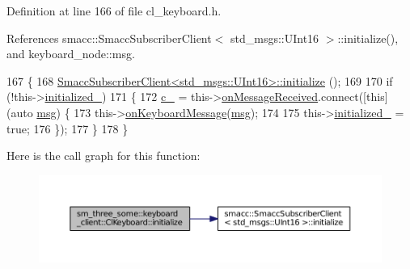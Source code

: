 Definition at line 166 of file cl\+\_\+keyboard.\+h.



References smacc\+::\+Smacc\+Subscriber\+Client$<$ std\+\_\+msgs\+::\+U\+Int16 $>$\+::initialize(), and keyboard\+\_\+node\+::msg.


\begin{DoxyCode}
167         \{
168                 \hyperlink{classsmacc_1_1SmaccSubscriberClient_acfa97685ecc588fe61eb57002354b58a}{SmaccSubscriberClient<std\_msgs::UInt16>::initialize}
      ();
169 
170                 \textcolor{keywordflow}{if} (!this->\hyperlink{classsm__three__some_1_1keyboard__client_1_1ClKeyboard_a27fc5aa7027eda6dddd0756448b48172}{initialized\_})
171                 \{
172                         \hyperlink{classsm__three__some_1_1keyboard__client_1_1ClKeyboard_aa55cfcdd60014aed37b8318224e47f9d}{c\_} = this->\hyperlink{classsmacc_1_1SmaccSubscriberClient_a7635fbb013c6fdbc3998da11b44766bb}{onMessageReceived}.connect([\textcolor{keyword}{this}](\textcolor{keyword}{auto} 
      \hyperlink{namespacekeyboard__node_a768777e12f75b89e4a0a60acf748e9eb}{msg}) \{
173                                 this->\hyperlink{classsm__three__some_1_1keyboard__client_1_1ClKeyboard_ae5a79e852ff467f4b0c3aa3660ecc4db}{onKeyboardMessage}(\hyperlink{namespacekeyboard__node_a768777e12f75b89e4a0a60acf748e9eb}{msg});
174 
175                                 this->\hyperlink{classsm__three__some_1_1keyboard__client_1_1ClKeyboard_a27fc5aa7027eda6dddd0756448b48172}{initialized\_} = \textcolor{keyword}{true};
176                         \});
177                 \}
178         \}
\end{DoxyCode}


Here is the call graph for this function\+:
\nopagebreak
\begin{figure}[H]
\begin{center}
\leavevmode
\includegraphics[width=350pt]{classsm__three__some_1_1keyboard__client_1_1ClKeyboard_a03947867843ecc8260c184592a34cc72_cgraph}
\end{center}
\end{figure}


